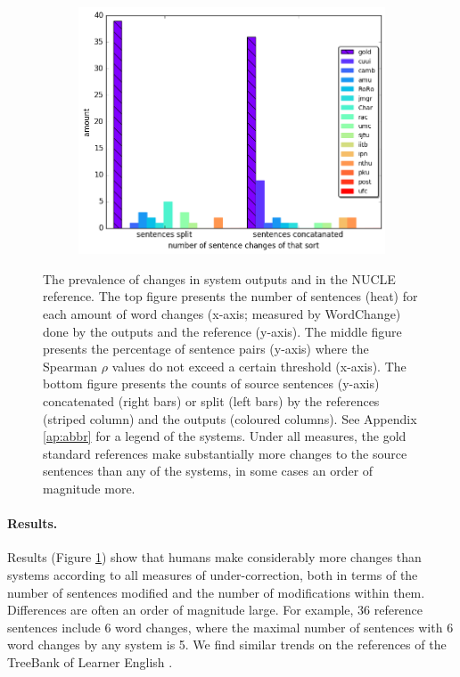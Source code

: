 \documentclass[11pt, a4paper]{article}
\begin{document}
\begin{figure}
\begin{subfigure}[]{.85\columnwidth}
		\includegraphics[width = \textwidth]{aligned}
	\end{subfigure}
	\caption{\label{fig:over-conservatism}
		The prevalence of changes in system outputs and in the NUCLE reference.
		The top figure presents the number of sentences (heat) for each amount of word changes
		(x-axis; measured by {\sc WordChange}) done by the outputs and the reference (y-axis).
		The middle figure presents the percentage of sentence pairs (y-axis) where the
		Spearman $\rho$ values do not exceed a certain threshold (x-axis).
		The bottom figure presents the counts of source sentences (y-axis) concatenated (right bars) or split (left bars) by the references (striped column) and the outputs (coloured columns).
		See Appendix \ref{ap:abbr} for a legend of the systems.
		Under all measures, the gold standard references make substantially more changes to the source sentences than any of the systems, in some cases an order of magnitude more.
	}
\end{figure}

\paragraph{Results.} \hspace{-.5cm}
Results (Figure \ref{fig:over-conservatism}) show that humans make considerably more changes than systems according to all measures of under-correction, 
both in terms of the number of sentences modified and the number of modifications within them. Differences are often an order of magnitude large.
For example, 36 reference sentences include 6 word changes, where the maximal number of sentences with 6 word changes by any system is 5.
We find similar trends on the references of the TreeBank of Learner English \cite{yannakoudakis2011new}.
\end{document}
